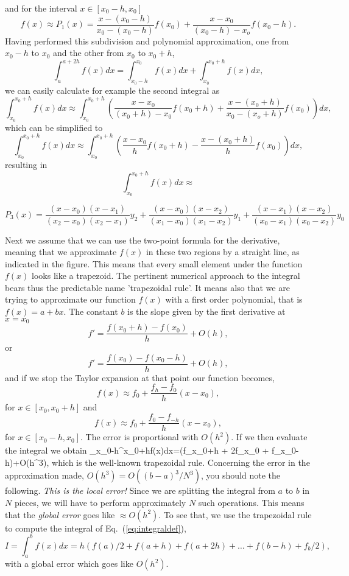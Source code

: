 and for the interval  $x\in[x_0-h,x_0]$
\[
   f(x)\approx P_1(x)=\frac{x-(x_0-h)}{x_0-(x_0-h)}f(x_0)+\frac{x-x_0}{(x_0-h)-x_o}f(x_0-h).
\]
Having performed this subdivision and polynomial approximation,
one from $x_0-h$ to $x_0$ and the other from $x_0$ to $x_0+h$,
\[
   \int_a^{a+2h}f(x)dx=
 \int_{x_0-h}^{x_0}f(x)dx+\int_{x_0}^{x_0+h}f(x)dx,
\]
we can easily calculate for example the second integral as
\[
\int_{x_0}^{x_0+h}f(x)dx\approx \int_{x_0}^{x_0+h}\left(\frac{x-x_0}{(x_0+h)-x_0}f(x_0+h)+\frac{x-(x_0+h)}{x_0-(x_o+h)}f(x_0)\right)dx,
\]
which can be simplified to
\[
\int_{x_0}^{x_0+h}f(x)dx\approx \int_{x_0}^{x_0+h}\left(\frac{x-x_0}{h}f(x_0+h)-\frac{x-(x_0+h)}{h}f(x_0)\right)dx,
\]
resulting in
\[
\int_{x_0}^{x_0+h}f(x)dx\approx
\]

\[
     P_3(x)=\frac{(x-x_0)(x-x_1)}{(x_2-x_0)(x_2-x_1)}y_2+
            \frac{(x-x_0)(x-x_2)}{(x_1-x_0)(x_1-x_2)}y_1+
            \frac{(x-x_1)(x-x_2)}{(x_0-x_1)(x_0-x_2)}y_0
\]


 Next we assume that 
we can use the two-point formula for the derivative, meaning that we approximate
$f(x)$ in these two regions by a straight line, as indicated in the figure. 
This means that every small element under the function $f(x)$ looks like a
trapezoid. The pertinent numerical approach to the integral
bears thus the predictable name 'trapezoidal rule'.
It means also that we are trying to approximate our function
$f(x)$ with a first order polynomial, that is $f(x)=a+bx$.
The constant $b$ is the slope given by the  
first derivative at $x=x_0$
\[
    f'= \frac{f(x_0+h)-f(x_0)}{h}+O(h),
\]
or 
\[
    f'= \frac{f(x_0)-f(x_0-h)}{h}+O(h),
\]
and if we stop the Taylor expansion at that point our function becomes,
\[
   f(x)\approx f_0 + \frac{f_h-f_0}{h}(x-x_0),
\]
for $x\in [x_0,x_0+h]$ and  
\[
   f(x)\approx f_0 + \frac{f_0-f_{-h}}{h}(x-x_0),
\]
for $x\in [x_0-h,x_0]$. The error is proportional with  $O(h^2)$.
If we then evaluate the integral we obtain
\be
   \int_{x_0-h}^{x_0+h}f(x)dx=\left(f_{x_0+h} + 2f_{x_0} + f_{x_0-h}\right)+O(h^3),
   \label{eq:trapez}
\ee
which is the well-known trapezoidal rule.  Concerning the error in the approximation made,
$O(h^3)=O((b-a)^3/N^3)$, you should  note 
the following.   {\em This is the local error!} Since we are splitting the integral from
$a$ to $b$ in $N$ pieces, we will have to perform approximately $N$ 
such operations.
This means that the {\em global error} goes like $\approx O(h^2)$. 
To see that, we use
the trapezoidal rule to compute
the integral     of Eq.\ (\ref{eq:integraldef}), 
\begin{equation}
   I=\int_a^bf(x) dx=h\left(f(a)/2 + f(a+h) +f(a+2h)+
                          \dots +f(b-h)+ f_{b}/2\right),
   \label{eq:trapez1}
\end{equation}
with a global error which goes like $O(h^2)$. 


